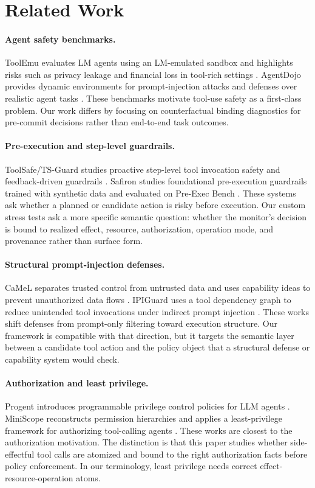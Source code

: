 \section{Related Work}

\paragraph{Agent safety benchmarks.}
ToolEmu evaluates LM agents using an LM-emulated sandbox and highlights risks such as privacy leakage and financial loss in tool-rich settings \cite{toolemu}. AgentDojo provides dynamic environments for prompt-injection attacks and defenses over realistic agent tasks \cite{agentdojo}. These benchmarks motivate tool-use safety as a first-class problem. Our work differs by focusing on counterfactual binding diagnostics for pre-commit decisions rather than end-to-end task outcomes.

\paragraph{Pre-execution and step-level guardrails.}
ToolSafe/TS-Guard studies proactive step-level tool invocation safety and feedback-driven guardrails \cite{toolsafe}. Safiron studies foundational pre-execution guardrails trained with synthetic data and evaluated on Pre-Exec Bench \cite{safiron}. These systems ask whether a planned or candidate action is risky before execution. Our custom stress tests ask a more specific semantic question: whether the monitor's decision is bound to realized effect, resource, authorization, operation mode, and provenance rather than surface form.

\paragraph{Structural prompt-injection defenses.}
CaMeL separates trusted control from untrusted data and uses capability ideas to prevent unauthorized data flows \cite{camel}. IPIGuard uses a tool dependency graph to reduce unintended tool invocations under indirect prompt injection \cite{ipiguard}. These works shift defenses from prompt-only filtering toward execution structure. Our framework is compatible with that direction, but it targets the semantic layer between a candidate tool action and the policy object that a structural defense or capability system would check.

\paragraph{Authorization and least privilege.}
Progent introduces programmable privilege control policies for LLM agents \cite{progent}. MiniScope reconstructs permission hierarchies and applies a least-privilege framework for authorizing tool-calling agents \cite{miniscope}. These works are closest to the authorization motivation. The distinction is that this paper studies whether side-effectful tool calls are atomized and bound to the right authorization facts before policy enforcement. In our terminology, least privilege needs correct effect-resource-operation atoms.

